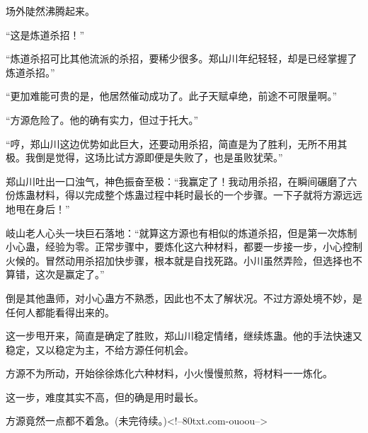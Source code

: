 \begin{this_body}
场外陡然沸腾起来。

“这是炼道杀招！”

“炼道杀招可比其他流派的杀招，要稀少很多。郑山川年纪轻轻，却是已经掌握了炼道杀招。”

“更加难能可贵的是，他居然催动成功了。此子天赋卓绝，前途不可限量啊。”

“方源危险了。他的确有实力，但过于托大。”

“哼，郑山川这边优势如此巨大，还要动用杀招，简直是为了胜利，无所不用其极。我倒是觉得，这场比试方源即便是失败了，也是虽败犹荣。”

郑山川吐出一口浊气，神色振奋至极：“我赢定了！我动用杀招，在瞬间碾磨了六份炼蛊材料，得以完成整个炼蛊过程中耗时最长的一个步骤。一下子就将方源远远地甩在身后！”

岐山老人心头一块巨石落地：“就算这方源也有相似的炼道杀招，但是第一次炼制小心蛊，经验为零。正常步骤中，要炼化这六种材料，都要一步接一步，小心控制火候的。冒然动用杀招加快步骤，根本就是自找死路。小川虽然弄险，但选择也不算错，这次是赢定了。”

倒是其他蛊师，对小心蛊方不熟悉，因此也不太了解状况。不过方源处境不妙，是任何人都能看得出来的。

这一步甩开来，简直是确定了胜败，郑山川稳定情绪，继续炼蛊。他的手法快速又稳定，又以稳定为主，不给方源任何机会。

方源不为所动，开始徐徐炼化六种材料，小火慢慢煎熬，将材料一一炼化。

这一步，难度其实不高，但的确是用时最长。

方源竟然一点都不着急。(未完待续。)<!--80txt.com-ouoou-->

\end{this_body}

